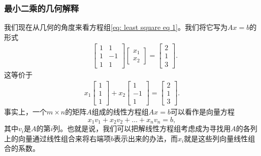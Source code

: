\documentclass[10pt]{beamer}
\begin{document}
\begin{frame}
\frametitle{最小二乘的几何解释}
我们现在从几何的角度来看方程组\eqref{eq: least square eq 1}。我们将它写为$Ax = b$的形式
\begin{align}
&\left[ \begin{array}{cc}
     1    & 1 \\
     1    &   -1 \\
     1    &  1                          
            \end{array} \right] 
\left[ \begin{array}{c} 
      x_1 \\ x_2 \end{array} \right] 
=
\left[ \begin{array}{c}
     2 \\ 1 \\3  \end{array} \right].
\end{align}
这等价于
\begin{align}
\label{eq: least square 2}
x_1\left[ \begin{array}{c}
     1     \\
     1     \\
     1                           
            \end{array} \right] 
+
x_2\left[ \begin{array}{c}
     1     \\
     -1     \\
     1                           
            \end{array} \right] 
=
\left[ \begin{array}{c}
     2 \\ 1 \\3  \end{array} \right].
\end{align}
事实上，一个$m\times n$的矩阵$A$组成的线性方程组$Ax = b$可以看作是向量方程
\begin{equation}
\label{eq: least square 3}
x_1 v_1 + x_2 v_2 + \ldots + x_n v_n = b,
\end{equation}
其中$v_i$是$A$的第$i$列。也就是说，我们可以把解线性方程组考虑成为寻找用$A$的各列上的向量通过线性组合来将右端项$b$表示出来的办法，而$x_i$就是这些列向量线性组合的系数。
\end{frame}
\end{document}
